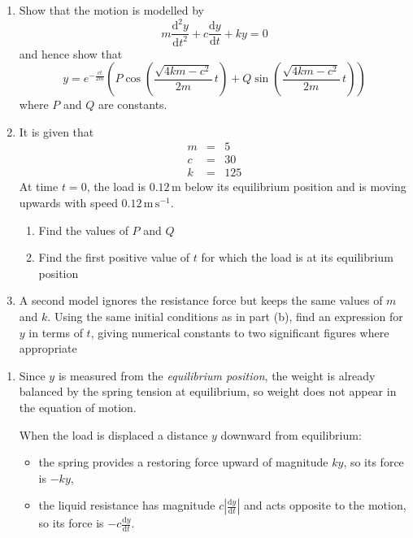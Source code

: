 \documentclass[leqno]{article}
\begin{document}
\begin{enumerate}[
  label=\textbf{\arabic*.},
  leftmargin=*,
  topsep=0pt,
  partopsep=0pt,
  parsep=0pt
]
\begin{enumerate}[label=\textbf{(\alph*)}]
  \item Show that the motion is modelled by
  \[
  m\frac{\mathrm{d}^2 y}{\mathrm{d} t^2}+c\frac{\mathrm{d} y}{\mathrm{d} t}+ky=0
  \]
  and hence show that
  \[
  y=e^{-\frac{c t}{2m}}\left(P\cos\left(\frac{\sqrt{4km-c^2}}{2m}\,t\right)+Q\sin\left(\frac{\sqrt{4km-c^2}}{2m}\,t\right)\right)
  \]
  where $P$ and $Q$ are constants.  \\
  \item It is given that
  \[
  \renewcommand{\arraystretch}{1.2}
  \begin{array}{rcl}
  m&=&5\\
  c&=&30\\
  k&=&125
  \end{array}
  \]
  At time $t=0$, the load is $0.12\,\mathrm{m}$ below its equilibrium position and is moving upwards with speed $0.12\,\mathrm{m\,s^{-1}}$. \\
  \begin{enumerate}[label=(\roman*)]
    \item Find the values of $P$ and $Q$ 
    \item Find the first positive value of $t$ for which the load is at its equilibrium position  \\
  \end{enumerate}
  \item A second model ignores the resistance force but keeps the same values of $m$ and $k$. Using the same initial conditions as in part (b), find an expression for $y$ in terms of $t$, giving numerical constants to two significant figures where appropriate  \\
\end{enumerate}

\vspace*{10pt}

\begin{djsSolution}
\begin{enumerate}[label=\textbf{(\alph*)}]
  \item Since $y$ is measured from the \emph{equilibrium position}, the weight is already balanced by the spring tension at equilibrium, so weight does not appear in the equation of motion.

  When the load is displaced a distance $y$ downward from equilibrium:

  \begin{itemize}
    \item the spring provides a restoring force upward of magnitude $ky$, so its force is $-ky$,
    \item the liquid resistance has magnitude $c\left|\frac{\mathrm{d}y}{\mathrm{d}t}\right|$ and acts opposite to the motion, so its force is $-c\frac{\mathrm{d}y}{\mathrm{d}t}$.
  \end{itemize}


\end{enumerate}
\end{djsSolution}
\end{enumerate}
\end{document}
